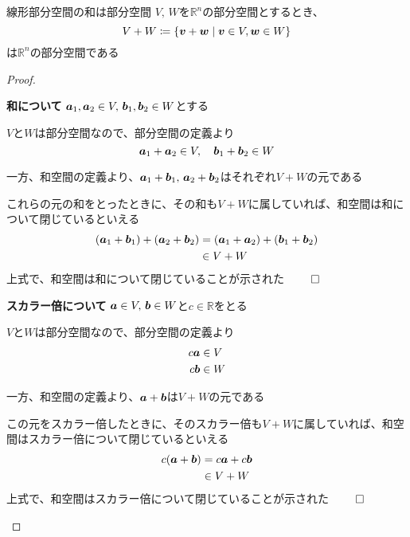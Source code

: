 \documentclass[../../../topic_linear-algebra]{subfiles}
\begin{document}
\begin{theorem}{線形部分空間の和は部分空間}
  $V,\,W$を$\mathbb{R}^n$の部分空間とするとき、
  \begin{equation*}
    V + W \coloneq \{ \vb*{v} + \vb*{w} \mid \vb*{v} \in V, \vb*{w} \in W \}
  \end{equation*}
  は$\mathbb{R}^n$の部分空間である
\end{theorem}

\begin{proof}
  \begin{subpattern}{\bfseries 和について}
    $\vb*{a}_1, \vb*{a}_2 \in V, \, \vb*{b}_1, \vb*{b}_2 \in W$とする

    $V$と$W$は部分空間なので、部分空間の定義より
    \begin{equation*}
      \vb*{a}_1 + \vb*{a}_2 \in V, \quad \vb*{b}_1 + \vb*{b}_2 \in W
    \end{equation*}

    一方、和空間の定義より、$\vb*{a}_1 + \vb*{b}_1,\, \vb*{a}_2 + \vb*{b}_2$はそれぞれ$V+W$の元である

    これらの元の和をとったときに、その和も$V + W$に属していれば、和空間は和について閉じているといえる
    \begin{align*}
      (\vb*{a}_1 + \vb*{b}_1) + (\vb*{a}_2 + \vb*{b}_2) & = (\vb*{a}_1 + \vb*{a}_2) + (\vb*{b}_1 + \vb*{b}_2) \\
                                                        & \in V + W
    \end{align*}
    上式で、和空間は和について閉じていることが示された $\qed$
  \end{subpattern}

  \begin{subpattern}{\bfseries スカラー倍について}
    $\vb*{a} \in V, \, \vb*{b} \in W$と$c \in \mathbb{R}$をとる

    $V$と$W$は部分空間なので、部分空間の定義より
    \begin{align*}
      c \vb*{a} & \in V \\
      c \vb*{b} & \in W
    \end{align*}

    一方、和空間の定義より、$\vb*{a} + \vb*{b}$は$V + W$の元である

    この元をスカラー倍したときに、そのスカラー倍も$V + W$に属していれば、和空間はスカラー倍について閉じているといえる
    \begin{align*}
      c(\vb*{a} + \vb*{b}) & = c \vb*{a} + c \vb*{b} \\
                           & \in V + W
    \end{align*}
    上式で、和空間はスカラー倍について閉じていることが示された $\qed$
  \end{subpattern}
\end{proof}
\end{document}
